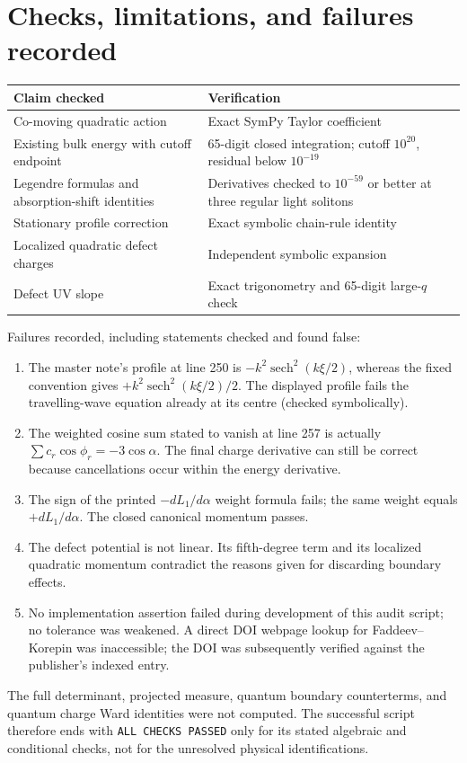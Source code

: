 \documentclass[11pt,a4paper]{article}
\begin{document}
\section{Checks, limitations, and failures recorded}
\begin{center}\small
\begin{tabular}{p{.53\linewidth}p{.36\linewidth}}
\toprule
Claim checked & Verification\\\midrule
Co-moving quadratic action & Exact SymPy Taylor coefficient\\
Existing bulk energy with cutoff endpoint & 65-digit closed integration;
cutoff $10^{20}$, residual below $10^{-19}$\\
Legendre formulas and absorption-shift identities & Derivatives checked to
$10^{-59}$ or better at three regular light solitons\\
Stationary profile correction & Exact symbolic chain-rule identity\\
Localized quadratic defect charges & Independent symbolic expansion\\
Defect UV slope & Exact trigonometry and 65-digit large-$q$ check\\\bottomrule
\end{tabular}
\end{center}
Failures recorded, including statements checked and found false:
\begin{enumerate}
\item The master note's profile at line 250 is
$-k^2\operatorname{sech}^2(k\xi/2)$, whereas the fixed convention gives
$+k^2\operatorname{sech}^2(k\xi/2)/2$. The displayed profile fails the
travelling-wave equation already at its centre (checked symbolically).
\item The weighted cosine sum stated to vanish at line 257 is actually
$\sum c_r\cos\phi_r=-3\cos\alpha$. The final charge derivative can still be
correct because cancellations occur within the energy derivative.
\item The sign of the printed $-dL_1/d\alpha$ weight formula fails;
the same weight equals $+dL_1/d\alpha$. The closed canonical momentum passes.
\item The defect potential is not linear. Its fifth-degree term and its
localized quadratic momentum contradict the reasons given for discarding
boundary effects.
\item No implementation assertion failed during development of this audit
script; no tolerance was weakened. A direct DOI webpage lookup for
Faddeev--Korepin was inaccessible; the DOI was subsequently verified against
the publisher's indexed entry.
\end{enumerate}
The full determinant, projected measure, quantum boundary counterterms,
and quantum charge Ward identities were not computed. The successful script
therefore ends with \texttt{ALL CHECKS PASSED} only for its stated algebraic
and conditional checks, not for the unresolved physical identifications.
\end{document}
